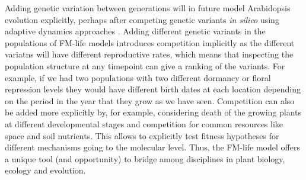 Adding genetic variation between generations will in future model Arabidopsis
evolution explicitly, perhaps after competing genetic variants \emph{in silico}
using adaptive dynamics approaches \citep{brannstrom_hitchhikers_2013,
  weise_mechanistic_2015}. Adding different genetic variants in the populations
of FM-life models introduces competition implicitly as the different variatns
will have different reproductive rates, which means that inspecting the
population structure at any timepoint can give a ranking of the variants. For
example, if we had two populations with two different dormancy or floral
repression levels they would have different birth dates at each location
depending on the period in the year that they grow as we have seen. Competition
can also be added more explicitly by, for example, considering death of the
growing plants at different developmental stages and competition for common
resources like space and soil nutrients. This allows to explicitly test fitness
hypotheses for different mechanisms going to the molecular level. Thus, the
FM-life model offers a unique tool (and opportunity) to bridge among disciplines
in plant biology, ecology and evolution.
